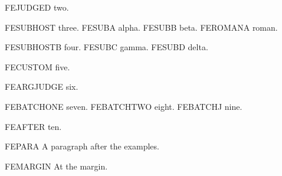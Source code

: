 \pex *FEJUDGED two.

\pex FESUBHOST three.
\pa FESUBA alpha.
\pb FESUBB beta.
\pa FEROMANA roman.

\pex FESUBHOSTB four.
\pa FESUBC gamma.
\pb FESUBD delta.

 FECUSTOM five.

\pexj{\#} FEARGJUDGE six.

\begin{pexe}
\pit FEBATCHONE seven.
\pit FEBATCHTWO eight.
 FEBATCHJ nine.
\end{pexe}

\pex FEAFTER ten.

FEPARA A paragraph after the examples.

\noindent FEMARGIN At the margin.


